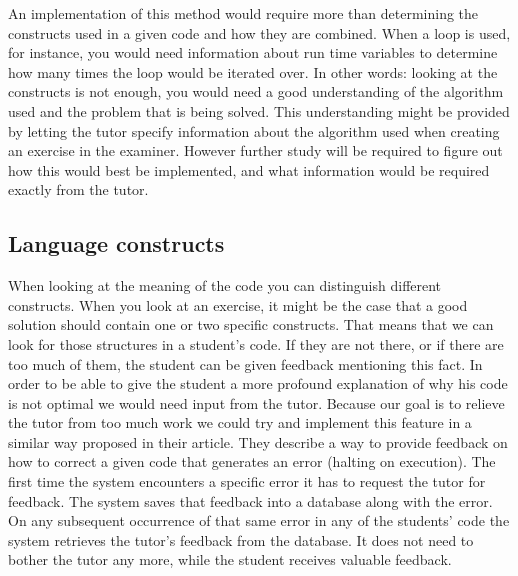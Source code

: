 An implementation of this method would require more than
determining the \glspl{construct} used in a given \gls{code}
and how they are combined.
When a loop is used, for instance,
you would need information about run time variables
to determine how many times the loop would be iterated over.
In other words: looking at the \glspl{construct} is not enough,
you would need a good understanding of the algorithm used
and the problem that is being solved.
This understanding might be provided
by letting the \gls{tutor} specify information about the algorithm used
when creating an \gls{exercise} in the \gls{examiner}.
However further study will be required to figure out
how this would best be implemented,
and what information would be required exactly from the \gls{tutor}.

\subsection{Language constructs}

When looking at the meaning of the \gls{code}
you can distinguish different \glspl{construct}.
When you look at an \gls{exercise},
it might be the case that a good \gls{solution}
should contain one or two specific \glspl{construct}.
That means that we can look for those structures
in a \gls{student}'s \gls{code}.
If they are not there, or if there are too much of them,
the \gls{student} can be given \gls{feedback} mentioning this fact.
In order to be able to give the \gls{student} a more profound explanation
of why his \gls{code} is not optimal we would need input from the \gls{tutor}.
Because our goal is to relieve the \gls{tutor} from too much work
we could try and implement this feature in a similar way
\citet[Section 3.2]{watson2011learning} proposed in their article.
They describe a way to provide \gls{feedback}
on how to correct a given \gls{code} that generates an error
(halting on execution).
The first time the system encounters a specific error
it has to request the \gls{tutor} for \gls{feedback}.
The system saves that \gls{feedback} into a database along with the error.
On any subsequent occurrence of that same error
in any of the \glspl{student}' \gls{code}
the system retrieves the \gls{tutor}'s \gls{feedback} from the database.
It does not need to bother the \gls{tutor} any more,
while the \gls{student} receives valuable \gls{feedback}.

